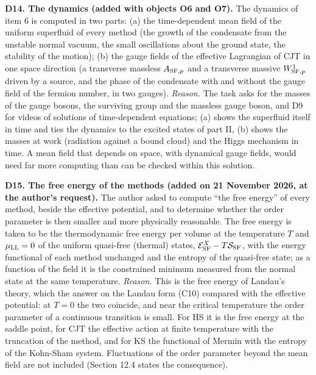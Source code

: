 \documentclass[
  10pt,
]{article}
\begin{document}
\textbf{D14. The dynamics (added with objects O6 and O7).} The dynamics
of item 6 is computed in two parts: (a) the time-dependent mean field of
the uniform superfluid of every method (the growth of the condensate
from the unstable normal vacuum, the small oscillations about the ground
state, the stability of the motion); (b) the gauge fields of the
effective Lagrangian of CJT in one space direction (a transverse
massless \(A_{{\rm SF},p}\) and a transverse massive
\(W^1_{{\rm SF},p}\) driven by a source, and the phase of the condensate
with and without the gauge field of the fermion number, in two gauges).
\emph{Reason.} The task asks for the masses of the gauge bosons, the
surviving group and the massless gauge boson, and D9 for videos of
solutions of time-dependent equations; (a) shows the superfluid itself
in time and ties the dynamics to the excited states of part II, (b)
shows the masses at work (radiation against a bound cloud) and the Higgs
mechanism in time. A mean field that depends on space, with dynamical
gauge fields, would need far more computing than can be checked within
this solution.

\textbf{D15. The free energy of the methods (added on 21 November 2026,
at the author's request).} The author asked to compute ``the free
energy'' of every method, beside the effective potential, and to
determine whether the order parameter is then smaller and more
physically reasonable. The free energy is taken to be the thermodynamic
free energy per volume at the temperature \(T\) and \(\mu_{\rm LL}=0\)
of the uniform quasi-free (thermal) states,
\(\mathcal E^X_{\rm SF}-T\mathcal S_{\rm SF}\), with the energy
functional of each method unchanged and the entropy of the quasi-free
state; as a function of the field it is the constrained minimum measured
from the normal state at the same temperature. \emph{Reason.} This is
the free energy of Landau's theory, which the answer on the Landau form
(C10) compared with the effective potential: at \(T=0\) the two
coincide, and near the critical temperature the order parameter of a
continuous transition is small. For HS it is the free energy at the
saddle point, for CJT the effective action at finite temperature with
the truncation of the method, and for KS the functional of Mermin with
the entropy of the Kohn-Sham system. Fluctuations of the order parameter
beyond the mean field are not included (Section 12.4 states the
consequence).
\end{document}
